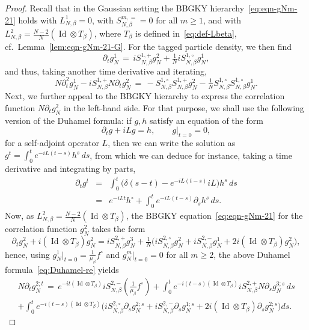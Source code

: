 \documentclass[a4paper,11pt,reqno,noindent]{amsart}
\theoremstyle{plain}
\numberwithin{equation}{section}
\newcommand{\Id}{\operatorname{Id}}
\newcommand{\3}{|\!|\!|}
\begin{document}
\begin{proof}
Recall that in the Gaussian setting the BBGKY hierarchy~\eqref{eq:eqn-gNm-21} holds with $L_{N,\beta}^1=0$, with $S_{N,\beta}^{m,=}=0$ for all $m\ge1$, and with $L_{N,\beta}^2=\frac{N-2}N(\Id\otimes T_\beta)$, where $T_\beta$ is defined in~\eqref{eq:def-Lbeta}, cf.~Lemma~\ref{lem:eqn-gNm-21-G}.
For the tagged particle density, we then find
\begin{equation}\label{eq:dt1g1}
\partial_tg_N^1\,=\,iS_{N,\beta}^{1,+}g_N^2+\tfrac1NiS_{N,\beta}^{1,\circ}g_N^1,
\end{equation}
and thus, taking another time derivative and iterating,
\begin{equation}\label{eq:dt2g1}
N\partial_t^2g_N^1-iS_{N,\beta}^{1,+}N\partial_tg_N^2\,=\,-S_{N,\beta}^{1,\circ}S_{N,\beta}^{1,+}g_N^2-\tfrac1{N}S_{N,\beta}^{1,\circ}S_{N,\beta}^{1,\circ}g_N^1.
\end{equation}
Next, we further appeal to the BBGKY hierarchy to express the correlation function $N\partial_tg_N^2$ in the left-hand side. For that purpose, we shall use the following version of the Duhamel formula: if $g,h$ satisfy an equation of the form
\[\partial_tg+iLg=h,\qquad g|_{t=0}=0,\]
for a self-adjoint operator $L$, then we can write the solution as $g^t=\int_0^te^{-iL(t-s)}h^s\,ds$, from which we can deduce for instance, taking a time derivative and integrating by parts,
\begin{eqnarray}
\partial_tg^t&=&\int_0^t\big(\delta(s-t)-e^{-iL(t-s)}iL\big)h^s\,ds\nonumber\\
&=&e^{-iLt}h^\circ+\int_0^te^{-iL(t-s)}\partial_sh^s\,ds.\label{eq:Duhamel-re}
\end{eqnarray}
Now, as $L^2_{N,\beta}=\frac{N-2}N(\Id\otimes T_\beta)$, the BBGKY equation~\eqref{eq:eqn-gNm-21} for the correlation function $g_N^2$ takes the form
\[\partial_tg^2_N+i(\Id\otimes T_\beta)g^2_N=iS^{2,+}_{N,\beta}g_N^3+\tfrac1N\Big(iS^{2,\circ}_{N,\beta}g_N^2+iS_{N,\beta}^{2,-}g^1_N+2i(\Id\otimes T_\beta)g_N^2\Big),\]
hence, using $g_N^1|_{t=0}=\tfrac1{\mu_\beta}f^\circ$ and $g_N^m|_{t=0}=0$ for all $m\ge2$, the above Duhamel formula~\eqref{eq:Duhamel-re} yields
\begin{multline*}
N\partial_tg_N^{2;t}\,=\,e^{-it(\Id\otimes T_\beta)}iS_{N,\beta}^{2,-}(\tfrac1{\mu_\beta}f^\circ)
+\int_0^te^{-i(t-s)(\Id\otimes T_\beta)}iS_{N,\beta}^{2,+}N\partial_sg_N^{3;s}\,ds\\
+\int_0^te^{-i(t-s)(\Id\otimes T_\beta)}\Big(iS_{N,\beta}^{2,\circ}\partial_sg_N^{2;s}+iS_{N,\beta}^{2,-}\partial_sg_N^{1;s}+2i(\Id\otimes T_\beta)\partial_sg_N^{2;s}\Big)ds.

\end{multline*}
\end{proof}
\end{document}
